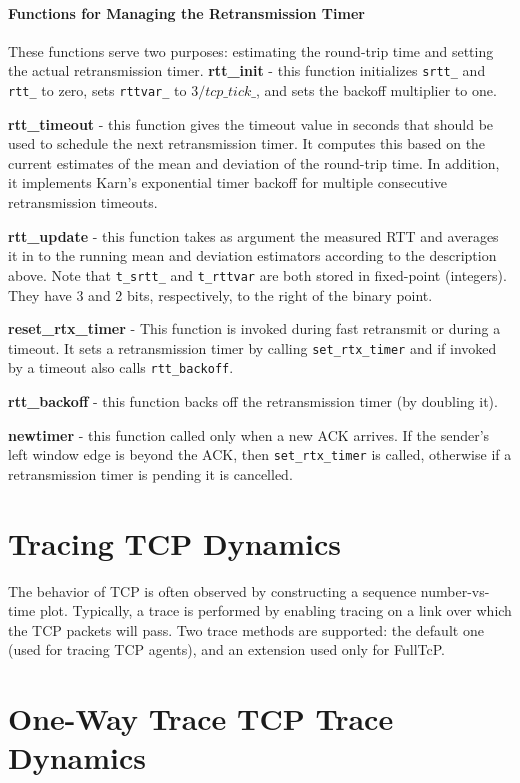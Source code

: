 \paragraph{Functions for Managing the Retransmission Timer}

These functions serve two purposes: estimating the round-trip time
and setting the actual retransmission timer.
{\bf rtt\_init} - this function initializes {\tt srtt\_} and {\tt rtt\_}
to zero, sets {\tt rttvar\_} to $3/tcp\_tick\_$, and sets the backoff
multiplier to one.

{\bf rtt\_timeout} - this function gives the timeout value in seconds that
should be used to schedule the next retransmission timer.
It computes this based on the current estimates of the mean and deviation
of the round-trip time.  In addition, it implements Karn's
exponential timer backoff for multiple consecutive retransmission timeouts.

{\bf rtt\_update} - this function takes as argument the measured RTT
and averages it in to the running mean and deviation estimators
according to the description above.
Note that {\tt t\_srtt\_} and {\tt t\_rttvar} are both
stored in fixed-point (integers).
They have 3 and 2 bits, respectively, to the right of the binary
point.

{\bf reset\_rtx\_timer} -  This function is invoked during fast retransmit
or during a timeout.
It sets a retransmission timer
by calling {\tt set\_rtx\_timer} and if invoked by a timeout also calls
{\tt rtt\_backoff}.

{\bf rtt\_backoff} - this function backs off the retransmission timer
(by doubling it).

{\bf newtimer} - this function called only when a new ACK arrives.
If the sender's left window edge is beyond the ACK, then
{\tt set\_rtx\_timer} is called, otherwise if a retransmission timer
is pending it is cancelled.

\section{Tracing TCP Dynamics}
\label{sec:traceTcpdyn}

The behavior of TCP is often observed by constructing a
sequence number-vs-time plot.
Typically, a trace is performed by enabling tracing on a link
over which the TCP packets will pass.
Two trace methods are supported: the default one (used for tracing
TCP agents), and an extension used only for FullTcP.

\section{One-Way Trace TCP Trace Dynamics}
\label{sec:trace1WayTcpdyn}

